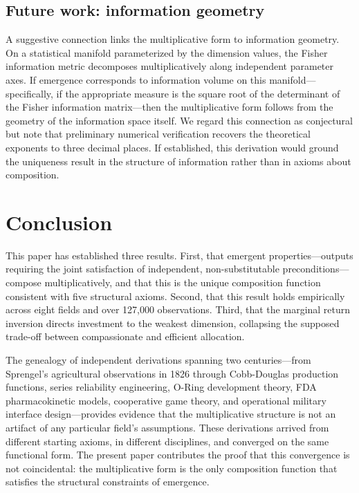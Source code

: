 \documentclass[12pt, a4paper]{article}
\theoremstyle{definition}
\theoremstyle{remark}
\begin{document}
\subsection{Future work: information geometry}

A suggestive connection links the multiplicative form to information geometry. On a statistical manifold parameterized by the dimension values, the Fisher information metric decomposes multiplicatively along independent parameter axes. If emergence corresponds to information volume on this manifold---specifically, if the appropriate measure is the square root of the determinant of the Fisher information matrix---then the multiplicative form follows from the geometry of the information space itself. We regard this connection as conjectural but note that preliminary numerical verification recovers the theoretical exponents to three decimal places. If established, this derivation would ground the uniqueness result in the structure of information rather than in axioms about composition.


\section{Conclusion}\label{sec:conclusion}

This paper has established three results. First, that emergent properties---outputs requiring the joint satisfaction of independent, non-substitutable preconditions---compose multiplicatively, and that this is the unique composition function consistent with five structural axioms. Second, that this result holds empirically across eight fields and over 127,000 observations. Third, that the marginal return inversion directs investment to the weakest dimension, collapsing the supposed trade-off between compassionate and efficient allocation.

The genealogy of independent derivations spanning two centuries---from Sprengel's agricultural observations in 1826 through Cobb-Douglas production functions, series reliability engineering, O-Ring development theory, FDA pharmacokinetic models, cooperative game theory, and operational military interface design---provides evidence that the multiplicative structure is not an artifact of any particular field's assumptions. These derivations arrived from different starting axioms, in different disciplines, and converged on the same functional form. The present paper contributes the proof that this convergence is not coincidental: the multiplicative form is the only composition function that satisfies the structural constraints of emergence.
\end{document}

